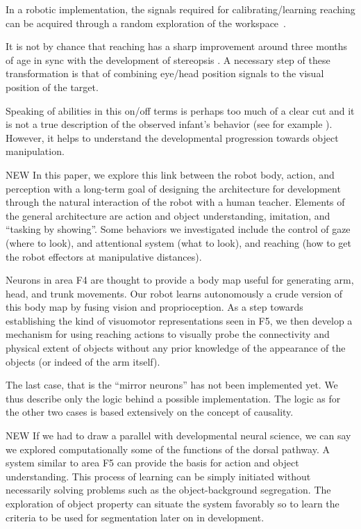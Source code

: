 \ifverbose
In a robotic
implementation, the signals required
for calibrating/learning reaching can be acquired 
through a random exploration of the 
workspace~\cite{metta99developmental, Marjanovic-96-SAB}.
\fi

\ifverbose
It is not by chance that reaching has 
a sharp improvement around three months of age in sync with the
development of stereopsis \cite{}. A necessary step of these 
transformation is that of combining eye/head position signals to 
the visual position of the target. 
\fi

\ifverbose
Speaking of abilities in this on/off terms is 
perhaps too much of a clear cut and it is not a true description
of the observed infant's behavior (see for example \cite{Streri}). 
However, it helps to understand the developmental progression towards 
object manipulation. 
\fi
 


\ifverbose
NEW In this paper, we explore this link between the robot body, action,
and perception with a long-term goal of designing the architecture for
development through the natural interaction of the robot with a human
teacher. Elements of the general architecture are action and object
understanding, imitation, and ``tasking by showing''. Some behaviors
we investigated include the control of gaze (where to look), and
attentional system (what to look), and reaching (how to get the robot
effectors at manipulative distances).
\fi

\ifverbose
Neurons in area F4 are thought to provide a body map useful for
generating arm, head, and trunk movements. Our robot learns
autonomously a crude version of this body map by fusing vision and
proprioception.  As a step towards establishing the kind of visuomotor
representations seen in F5, we then develop a mechanism for using
reaching actions to visually probe the connectivity and physical
extent of objects without any prior knowledge of the appearance of the
objects (or indeed of the arm itself).
\fi

\ifverbose
The last case, that is the ``mirror neurons'' has not been implemented
yet.  We thus describe only the logic behind a possible
implementation. The logic as for the other two cases is based
extensively on the concept of causality.
\fi

\ifverbose
NEW If we had to draw a parallel with developmental neural science, we can
say we explored computationally some of the functions of the dorsal
pathway. A system similar to area F5 can provide the basis for action
and object understanding. This process of learning can be simply
initiated without necessarily solving problems such as the
object-background segregation. The exploration of object property can
situate the system favorably so to learn the criteria to be used for
segmentation later on in development.
\fi





